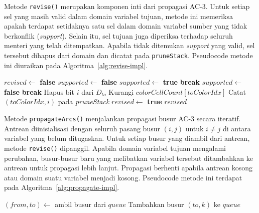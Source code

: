 Metode \texttt{revise()} merupakan komponen inti dari propagasi AC-3. Untuk setiap sel yang masih valid dalam domain variabel tujuan, metode ini memeriksa apakah terdapat setidaknya satu sel dalam domain variabel sumber yang tidak berkonflik (\textit{support}). Selain itu, sel tujuan juga diperiksa terhadap seluruh menteri yang telah ditempatkan. Apabila tidak ditemukan \textit{support} yang valid, sel tersebut dihapus dari domain dan dicatat pada \texttt{pruneStack}. Pseudocode metode ini diuraikan pada Algoritma~\ref{alg:revise-impl}.

\begin{algorithm}[!htbp]
	\caption{Fungsi \texttt{revise} pada kelas \texttt{BacktrackingSolverAC3}}
	\label{alg:revise-impl}
	\begin{algorithmic}[1]
		\State $revised \gets$ \textbf{false}
		\State $supported \gets$ \textbf{false}
		\State $supported \gets$ \textbf{true}
		\State \textbf{break}
		\EndIf
		\EndFor
		\State $supported \gets$ \textbf{false}
		\State \textbf{break}
		\EndIf
		\EndFor
		\EndIf
		\State Hapus bit $i$ dari $D_{to}$
		\State Kurangi $colorCellCount[toColorIdx]$
		\State Catat $(toColorIdx, i)$ pada \textit{pruneStack}
		\State $revised \gets$ \textbf{true}
		\EndIf
		\EndFor
		\State \Return $revised$
		\EndFunction
	\end{algorithmic}
\end{algorithm}

Metode \texttt{propagateArcs()} menjalankan propagasi busur AC-3 secara iteratif. Antrean diinisialisasi dengan seluruh pasang busur $(i, j)$ untuk $i \neq j$ di antara variabel yang belum ditugaskan. Untuk setiap busur yang diambil dari antrean, metode \texttt{revise()} dipanggil. Apabila domain variabel tujuan mengalami perubahan, busur-busur baru yang melibatkan variabel tersebut ditambahkan ke antrean untuk propagasi lebih lanjut. Propagasi berhenti apabila antrean kosong atau domain suatu variabel menjadi kosong. Pseudocode metode ini terdapat pada Algoritma~\ref{alg:propagate-impl}.

\begin{algorithm}[!htbp]
	\caption{Prosedur \texttt{propagateArcs} pada kelas \texttt{BacktrackingSolverAC3}}
	\label{alg:propagate-impl}
	\begin{algorithmic}[1]
		\State $(from, to) \gets$ ambil busur dari $queue$
		\State \Return {}
		\EndIf
		\State Tambahkan busur $(to, k)$ ke $queue$
		\EndFor
		\EndIf
		\EndWhile
		\EndFunction
	\end{algorithmic}
\end{algorithm}

